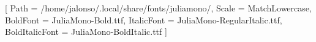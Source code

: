\usepackage[spanish, es-tabla]{babel}
\usepackage{mathtools}
\usepackage{amsthm}
\usepackage{graphicx}
\usepackage{xcolor}
\usepackage{enumitem}

\usepackage{unicode-math}
\usepackage{libertinus-otf} %

\setmonofont{JuliaMono-Regular.ttf}[
    Path = /home/jalonso/.local/share/fonts/juliamono/,
    Scale = MatchLowercase,
    BoldFont = JuliaMono-Bold.ttf,
    ItalicFont = JuliaMono-RegularItalic.ttf,
    BoldItalicFont = JuliaMono-BoldItalic.ttf
]

\usepackage{minted}
\renewcommand{\MintedPygmentize}{/home/jalonso/.local/bin/pygmentize}

\setcounter{secnumdepth}{3}
\setcounter{tocdepth}{3}

